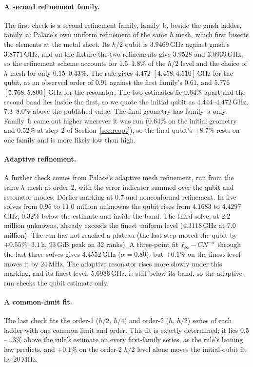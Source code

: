 \documentclass{anvil-paper}
\begin{document}
\paragraph{A second refinement family.}
The first check is a second refinement family, family~b, beside the gmsh
ladder, family~a: Palace's own uniform refinement of the same $h$ mesh,
which first bisects the elements at the metal sheet. Its $h/2$ qubit is $3.9469$\,GHz against
gmsh's $3.8771$\,GHz, and on the fixture the two refinements give $3.9528$
and $3.8939$\,GHz, so the refinement scheme accounts for $1.5$--$1.8\%$ of
the $h/2$ level and the choice of $h$ mesh for only $0.15$--$0.43\%$. The
rule gives $4.472$ $[4.458, 4.510]$\,GHz for the qubit, at an observed order
of $0.91$ against the first family's $0.61$, and $5.776$ $[5.768,
5.800]$\,GHz for the resonator. The two estimates lie $0.64\%$ apart and the
second band lies inside the first, so we quote the initial qubit as
$4.444$--$4.472$\,GHz, $7.3$--$8.0\%$ above the published value. The final
geometry has family~a only. Family~b came out higher wherever it was run
($0.64\%$ on the initial geometry and $0.52\%$ at step~2 of
Section~\ref{sec:reopt}), so the final qubit's $+8.7\%$ rests on one
family and is more likely low than high.

\paragraph{Adaptive refinement.}
A further check comes from Palace's adaptive mesh refinement, run from the
same $h$ mesh at order 2, with the error indicator summed over the qubit and resonator modes,
D\"orfler marking at $0.7$ and nonconformal refinement. In five solves from
$0.95$ to $11.0$ million unknowns the qubit rises from $4.1683$ to
$4.4297$\,GHz, $0.32\%$ below the estimate and inside the band. The third
solve, at $2.2$ million unknowns, already exceeds the finest uniform level
($4.3118$\,GHz at $7.0$ million). The run has not reached a plateau (the
last step moved the qubit by $+0.55\%$; $3.1$\,h, $93$\,GiB peak on 32
ranks). A three-point fit $f_\infty - CN^{-\alpha}$ through the last three
solves gives $4.4552$\,GHz ($\alpha = 0.80$), but $+0.1\%$ on the finest
level moves it by $24$\,MHz. The adaptive resonator rises more slowly under this
marking, and its finest level, $5.6986$\,GHz, is still below its band, so
the adaptive run checks the qubit estimate only.

\paragraph{A common-limit fit.}
The last check fits the
order-1 ($h/2$, $h/4$) and order-2 ($h$, $h/2$) series of each ladder with
one common limit and order. This fit is exactly determined; it lies
$0.5$--$1.3\%$ above the rule's estimate on every first-family series, as
the rule's leaning low predicts, and $+0.1\%$ on the order-2 $h/2$ level
alone moves the initial-qubit fit by $20$\,MHz.
\end{document}
